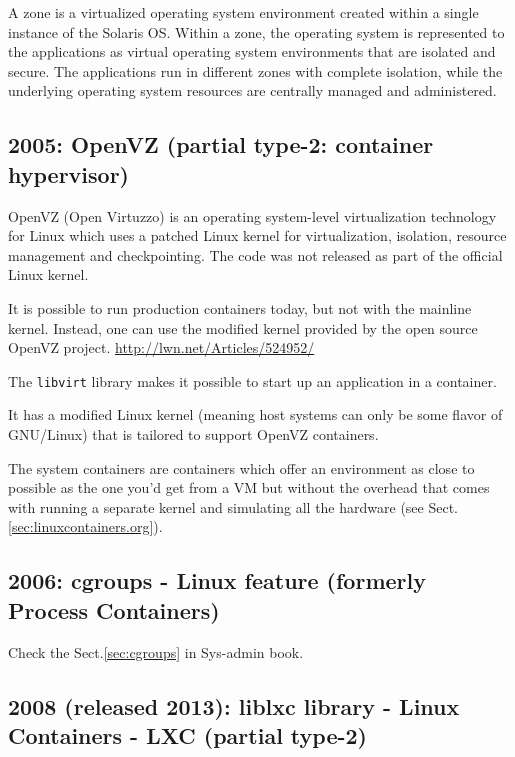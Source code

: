A zone is a virtualized operating system environment created within a single
instance of the Solaris OS. Within a zone, the operating system is represented
to the applications as virtual operating system environments that are isolated
and secure. The applications run in different zones with complete isolation,
while the underlying operating system resources are centrally managed and
administered.


\subsection{2005: OpenVZ (partial type-2: container hypervisor)}
\label{sec:OpenVZ}

OpenVZ (Open Virtuzzo) is an operating system-level virtualization technology
for Linux which uses a patched Linux kernel for virtualization, isolation,
resource management and checkpointing. The code was not released as part of the
official Linux kernel.


It is possible to run production containers today, but not with
the mainline kernel. Instead, one can use the modified kernel provided by the
open source OpenVZ project.  
\url{http://lwn.net/Articles/524952/}


The \verb!libvirt! library makes it possible to start up an application in a
container.

It has a modified Linux kernel (meaning host systems can only be some flavor of
GNU/Linux) that is tailored to support OpenVZ containers.

The system containers are containers which offer an environment as close to
possible as the one you'd get from a VM but without the overhead that comes with
running a separate kernel and simulating all the hardware (see
Sect.\ref{sec:linuxcontainers.org}).

\subsection{2006: cgroups - Linux feature (formerly Process Containers)}

Check the Sect.\ref{sec:cgroups} in Sys-admin book.


\subsection{2008 (released 2013): liblxc library - Linux Containers - LXC (partial type-2)}
\label{sec:LXC}

